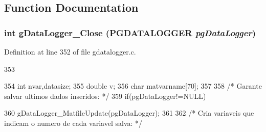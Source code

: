 \subsection{Function Documentation}
\subsubsection[{gDataLogger\_\-Close}]{\setlength{\rightskip}{0pt plus 5cm}int gDataLogger\_\-Close ({\bf PGDATALOGGER} {\em pgDataLogger})}\label{gdatalogger_8c_a0ac95f84c6ee484c4ad0351530f1c468}


Definition at line 352 of file gdatalogger.c.


\begin{DoxyCode}
353 {
354         int nvar,datasize;
355         double v;
356         char matvarname[70];
357 
358         /* Garante salvar ultimos dados inseridos: */
359         if(pgDataLogger!=NULL){
360                 gDataLogger_MatfileUpdate(pgDataLogger);
361 
362                 /* Cria variaveis que indicam o numero de cada variavel salva: */
      
}}
\end{DoxyCode}
